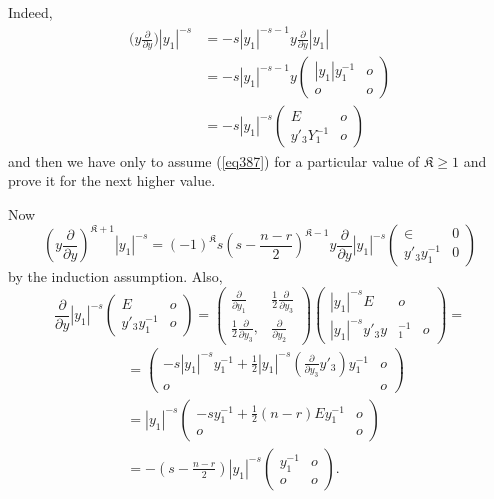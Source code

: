 Indeed,
\begin{align*} 
\big ( y \frac{\partial}{\partial y} \big) | y_1 |^{-s} & = - s | y_1
|^{- s - 1} y \frac{\partial}{\partial y} | y_1 |\\ 
& = -s | y_1 |^{-s - 1} y \begin{pmatrix} |y_1 | y_1^{-1} & o\\ o &
  o \end{pmatrix}\\ 
& = - s |y_1 |^{-s} \begin{pmatrix} E & o \\ y'_3 Y^{-1}_1 &
  o \end{pmatrix} 
\end{align*}
and then we have only to assume (\ref{eq387}) for a particular value of
$\mathfrak{K} \ge 1$ and prove it for the next higher value. 

Now 
\begin{equation*}
(y \frac{\partial}{\partial y})^{\mathfrak{K}+1} |y_1|^{-s} =
  (-1)^{\mathfrak{K}} s (s - \frac{n-r}{2})^{\mathfrak{K}-1} y
  \frac{\partial}{\partial y} |y_1|^{-s} \begin{pmatrix} \in & 0
    \\ y'_3 y^{-1}_1 & 0 \end{pmatrix} \tag{388}\label{eq388} 
\end{equation*}
by the induction assumption. Also,
$$
\frac{\partial}{\partial y} | y_1 |^{-s} \begin{pmatrix} E & o \\ y'_3
  y^{-1}_1 & o \end{pmatrix} = \begin{pmatrix}
  \frac{\partial}{\partial y_1} & \frac{1}{2} \frac{\partial}{\partial
    y_3} \\ \frac{1}{2} \frac{\partial }{\partial y_3}, &
  \frac{\partial}{\partial y_2} \end{pmatrix} \begin{pmatrix} | y_1
  |^{-s} E & o \\ |y_1 |^{-s} y'_3 y&^{-1}_1 & o \end{pmatrix}  
=
$$
\begin{align*}
& = 
\begin{pmatrix}
- s |y_1 |^{-s} y_1^{-1} + \frac{1}{2} | y_1 |^{-s}
(\frac{\partial}{\partial y_3} y'_3) y_1^{-1} & o\\ 
o & o
\end{pmatrix}\\
& = |y _1 |^{-s}
\begin{pmatrix}
- s y_1^{-1} + \frac{1}{2} (n - r ) E y^{-1}_1 & o\\
o & o
\end{pmatrix}\\
& = - (s - \frac{n - r}{2} ) |y _1|^{-s} \begin{pmatrix} y_1^{-1} & o
  \\ o & o \end{pmatrix}. 
\end{align*}\pageoriginale

